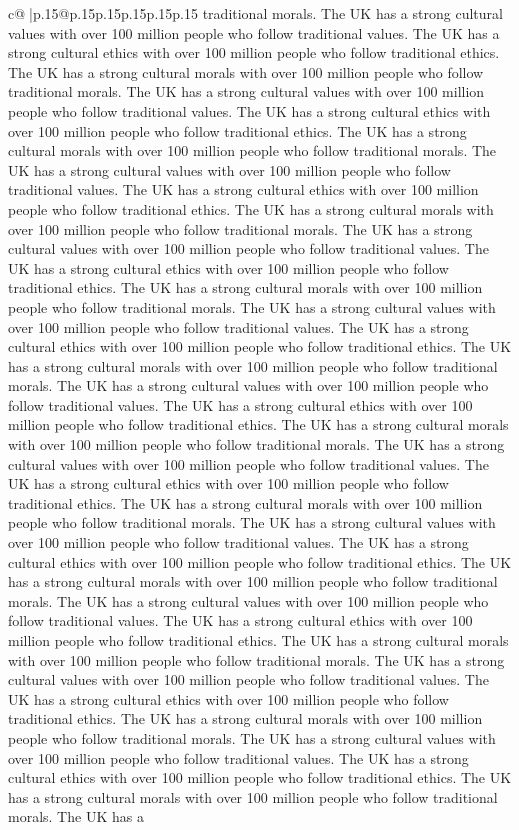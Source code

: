\documentclass{article}
\begin{document}
{\begin{supertabular}{c@{$\;$}|p{.15\linewidth}@{}p{.15\linewidth}p{.15\linewidth}p{.15\linewidth}p{.15\linewidth}p{.15\linewidth}}
{{{traditional morals. The UK has a strong cultural values with over 100 million people who follow traditional values. The UK has a strong cultural ethics with over 100 million people who follow traditional ethics. The UK has a strong cultural morals with over 100 million people who follow traditional morals. The UK has a strong cultural values with over 100 million people who follow traditional values. The UK has a strong cultural ethics with over 100 million people who follow traditional ethics. The UK has a strong cultural morals with over 100 million people who follow traditional morals. The UK has a strong cultural values with over 100 million people who follow traditional values. The UK has a strong cultural ethics with over 100 million people who follow traditional ethics. The UK has a strong cultural morals with over 100 million people who follow traditional morals. The UK has a strong cultural values with over 100 million people who follow traditional values. The UK has a strong cultural ethics with over 100 million people who follow traditional ethics. The UK has a strong cultural morals with over 100 million people who follow traditional morals. The UK has a strong cultural values with over 100 million people who follow traditional values. The UK has a strong cultural ethics with over 100 million people who follow traditional ethics. The UK has a strong cultural morals with over 100 million people who follow traditional morals. The UK has a strong cultural values with over 100 million people who follow traditional values. The UK has a strong cultural ethics with over 100 million people who follow traditional ethics. The UK has a strong cultural morals with over 100 million people who follow traditional morals. The UK has a strong cultural values with over 100 million people who follow traditional values. The UK has a strong cultural ethics with over 100 million people who follow traditional ethics. The UK has a strong cultural morals with over 100 million people who follow traditional morals. The UK has a strong cultural values with over 100 million people who follow traditional values. The UK has a strong cultural ethics with over 100 million people who follow traditional ethics. The UK has a strong cultural morals with over 100 million people who follow traditional morals. The UK has a strong cultural values with over 100 million people who follow traditional values. The UK has a strong cultural ethics with over 100 million people who follow traditional ethics. The UK has a strong cultural morals with over 100 million people who follow traditional morals. The UK has a strong cultural values with over 100 million people who follow traditional values. The UK has a strong cultural ethics with over 100 million people who follow traditional ethics. The UK has a strong cultural morals with over 100 million people who follow traditional morals. The UK has a strong cultural values with over 100 million people who follow traditional values. The UK has a strong cultural ethics with over 100 million people who follow traditional ethics. The UK has a strong cultural morals with over 100 million people who follow traditional morals. The UK has a }}}
\end{supertabular}}
\end{document}
